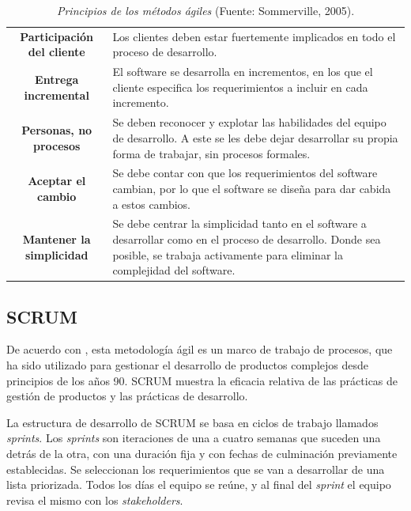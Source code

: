 	\begin{table}[t]
		\small
		\caption[Principios de los m\'{e}todos \'{a}giles]{\textit{Principios de los m\'{e}todos \'{a}giles} (Fuente: Sommerville, 2005).}
		\centering
		\setlength{\extrarowheight}{\altocelda}
		\begin{tabulary}{\anchotabla}{|c|J|}
			\hline
			 & \\ \hline
			\textbf{Participaci\'{o}n del cliente} & Los clientes deben estar fuertemente implicados en todo el proceso de desarrollo.\\ \hline
			\textbf{Entrega incremental} & El software se desarrolla en incrementos, en los que el cliente especifica los requerimientos a incluir en cada incremento.\\ \hline
			\textbf{Personas, no procesos} & Se deben reconocer y explotar las habilidades del equipo de desarrollo. A este se les debe dejar desarrollar su propia forma de trabajar, sin procesos formales.\\ \hline
			\textbf{Aceptar el cambio} & Se debe contar con que los requerimientos del software cambian, por lo que el software se dise\~{n}a para dar cabida a estos cambios.\\ \hline
			\textbf{Mantener la simplicidad} & Se debe centrar la simplicidad tanto en el software a desarrollar como en el proceso de desarrollo. Donde sea posible, se trabaja activamente para eliminar la complejidad del software.\\ \hline
		\end{tabulary}
	\end{table}

		\subsection{SCRUM}
De acuerdo con \cite{Schwaber&Sutherland}, esta metodolog\'{i}a \'{a}gil es un marco de trabajo de procesos, que ha sido utilizado para gestionar el desarrollo de productos complejos desde principios de los a\~{n}os 90. SCRUM muestra la eficacia relativa de las pr\'{a}cticas de gesti\'{o}n de productos y las pr\'{a}cticas de desarrollo.

La estructura de desarrollo de SCRUM se basa en ciclos de trabajo llamados \textit{sprints}. Los \textit{sprints} son iteraciones de una a cuatro semanas que suceden una detr\'{a}s de la otra, con una duraci\'{o}n fija y con fechas de culminaci\'{o}n previamente establecidas. Se seleccionan los requerimientos que se van a desarrollar de una lista priorizada. Todos los d\'{i}as el equipo se re\'{u}ne, y al final del \textit{sprint} el equipo revisa el mismo con los \textit{stakeholders}.

